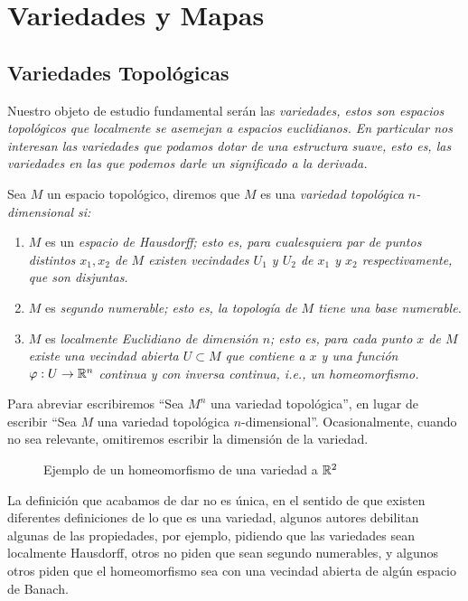 \chapter{Variedades y Mapas}\label{Capítulo: Variedades y Mapas}
\section{Variedades Topológicas}\label{Sección: Variedades Topologicas}
Nuestro objeto de estudio fundamental serán las \it{variedades}, estos son espacios topológicos que localmente se asemejan a espacios euclidianos. En particular nos interesan las variedades que podamos dotar de una estructura suave, esto es, las variedades en las que podemos darle un significado a la derivada.

\begin{definition}\label{Definición: Variedad Topologica}
	Sea $M$ un espacio topológico, diremos que $M$ es una \it{variedad topológica $n$-dimensional} si:
	\begin{enumerate}
		\item $M$ es un \it{espacio de Hausdorff}; esto es, para cualesquiera par de puntos distintos $x_1,x_2$ de $M$ existen vecindades $U_1$ y $U_2$ de $x_1$ y $x_2$ respectivamente, que son disjuntas.
		\item $M$ es \it{segundo numerable}; esto es, la topología de $M$ tiene una base numerable.
		\item $M$ es \it{localmente Euclidiano} de dimensión $n$; esto es, para cada punto $x$ de $M$ existe una vecindad abierta $U \subset M$ que contiene a $x$ y una función $\varphi: U \to \mathbb{R}^n$ continua y con inversa continua, i.e., un \it{homeomorfismo}.
	\end{enumerate}
\end{definition}

Para abreviar escribiremos \enquote{Sea $M^n$ una variedad topológica},  en lugar de escribir \enquote{Sea $M$ una variedad topológica $n$-dimensional}. Ocasionalmente, cuando no sea relevante, omitiremos escribir la dimensión de la variedad.

\begin{figure}[h!]
	\begin{center}
		
		\caption{Ejemplo de un homeomorfismo de una variedad a $\mathbb{R}^{2}$}
	\end{center}
\end{figure}

La definición que acabamos de dar no es única, en el sentido de que existen diferentes definiciones de lo que es una variedad, algunos autores debilitan algunas de las propiedades, por ejemplo, pidiendo que las variedades sean localmente Hausdorff, otros no piden que sean segundo numerables, y algunos otros piden que el homeomorfismo sea con una vecindad abierta de algún espacio de Banach.

